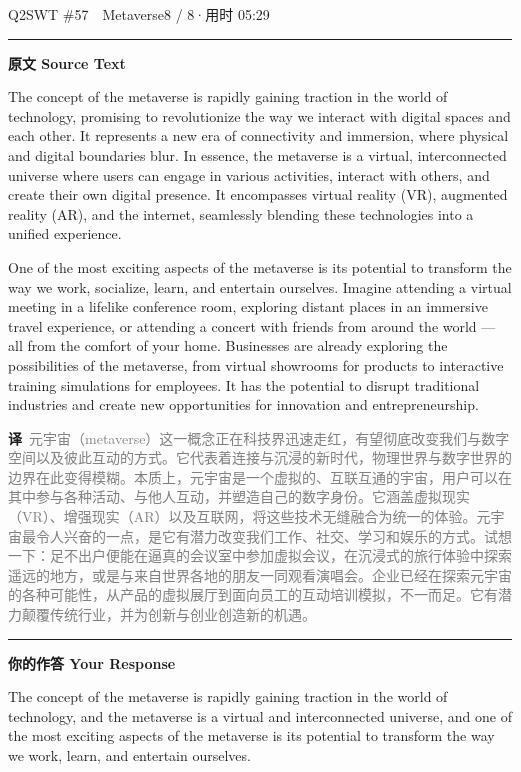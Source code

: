 \documentclass[11pt]{article}
\newcommand{\ptesub}[1]{%
  \par\needspace{2\baselineskip}\smallskip
  {\color{cAccent}\rule[-0.2ex]{3pt}{1.05em}}\hspace{6pt}%
  {\bfseries\color{cHead}#1}\par\nopagebreak\smallskip}
\newcommand{\zh}[1]{{\footnotesize\textcolor{cNote}{\textbf{译}}\ \textcolor{gray}{#1}}}
\begin{document}
\begin{qblock}{Q2\quad SWT \#57\ \ Metaverse}{8 / 8\quad·\quad 用时 05:29}

\ptesub{原文 Source Text}
\begin{promptbox}
The concept of the metaverse is rapidly gaining traction in the world of technology, promising to revolutionize the way we interact with digital spaces and each other. It represents a new era of connectivity and immersion, where physical and digital boundaries blur. In essence, the metaverse is a virtual, interconnected universe where users can engage in various activities, interact with others, and create their own digital presence. It encompasses virtual reality (VR), augmented reality (AR), and the internet, seamlessly blending these technologies into a unified experience.

One of the most exciting aspects of the metaverse is its potential to transform the way we work, socialize, learn, and entertain ourselves. Imagine attending a virtual meeting in a lifelike conference room, exploring distant places in an immersive travel experience, or attending a concert with friends from around the world — all from the comfort of your home. Businesses are already exploring the possibilities of the metaverse, from virtual showrooms for products to interactive training simulations for employees. It has the potential to disrupt traditional industries and create new opportunities for innovation and entrepreneurship.
\end{promptbox}
\zh{元宇宙（metaverse）这一概念正在科技界迅速走红，有望彻底改变我们与数字空间以及彼此互动的方式。它代表着连接与沉浸的新时代，物理世界与数字世界的边界在此变得模糊。本质上，元宇宙是一个虚拟的、互联互通的宇宙，用户可以在其中参与各种活动、与他人互动，并塑造自己的数字身份。它涵盖虚拟现实（VR）、增强现实（AR）以及互联网，将这些技术无缝融合为统一的体验。元宇宙最令人兴奋的一点，是它有潜力改变我们工作、社交、学习和娱乐的方式。试想一下：足不出户便能在逼真的会议室中参加虚拟会议，在沉浸式的旅行体验中探索遥远的地方，或是与来自世界各地的朋友一同观看演唱会。企业已经在探索元宇宙的各种可能性，从产品的虚拟展厅到面向员工的互动培训模拟，不一而足。它有潜力颠覆传统行业，并为创新与创业创造新的机遇。}

\ptesub{你的作答 Your Response}
\begin{youbox}
The concept of the metaverse is rapidly gaining traction in the world of technology, and the metaverse is a virtual and interconnected universe, and one of the most exciting aspects of the metaverse is its potential to transform the way we work, learn, and entertain ourselves.
\end{youbox}


\end{qblock}
\end{document}
